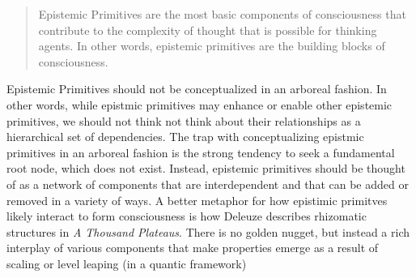 \begin{quote}
Epistemic Primitives are the most basic components of consciousness that contribute to the complexity of thought that is possible for thinking agents. In other words, epistemic primitives are the building blocks of consciousness.
\end{quote}

Epistemic Primitives should not be conceptualized in an arboreal fashion. In other words, while epistmic primitives may enhance or enable other epistemic primitives, we should not think not think about their relationships as a hierarchical set of dependencies. The trap with conceptualizing epistmic primitives in an arboreal fashion is the strong tendency to seek a fundamental root node, which does not exist. Instead, epistemic primitives should be thought of as a network of components that are interdependent and that can be added or removed in a variety of ways. A better metaphor for how epistimic primitves likely interact to form consciousness is how Deleuze describes rhizomatic structures in \textit{A Thousand Plateaus}. There is no golden nugget, but instead a rich interplay of various components that make properties emerge as a result of scaling or level leaping (in a quantic framework)
